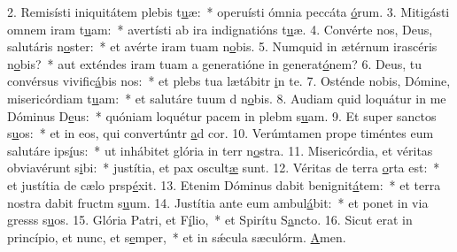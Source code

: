 2. Remisísti iniquitátem plebis t\uline{u}æ:~* operuísti ómnia peccáta \uline{ó}rum.
3. Mitigásti omnem iram t\uline{u}am:~* avertísti ab ira indignatións t\uline{u}æ.
4. Convérte nos, Deus, salutáris n\uline{o}ster:~* et avérte iram tuam  n\uline{o}bis.
5. Numquid in ætérnum irascéris n\uline{o}bis?~* aut exténdes iram tuam a generatióne in generat\uline{ó}nem?
6. Deus, tu convérsus vivific\uline{á}bis nos:~* et plebs tua lætábitr \uline{i}n te.
7. Osténde nobis, Dómine, misericórdiam t\uline{u}am:~* et salutáre tuum d n\uline{o}bis.
8. Audiam quid loquátur in me Dóminus D\uline{e}us:~* quóniam loquétur pacem in plebm s\uline{u}am.
9. Et super sanctos s\uline{u}os:~* et in eos, qui convertúntr \uline{a}d cor.
10. Verúmtamen prope timéntes eum salutáre ips\uline{í}us:~* ut inhábitet glória in terr n\uline{o}stra.
11. Misericórdia, et véritas obviavérunt s\uline{i}bi:~* justítia, et pax oscult\uline{æ} sunt.
12. Véritas de terra \uline{o}rta est:~* et justítia de cælo prsp\uline{é}xit.
13. Etenim Dóminus dabit benignit\uline{á}tem:~* et terra nostra dabit fructm s\uline{u}um.
14. Justítia ante eum ambul\uline{á}bit:~* et ponet in via gresss s\uline{u}os.
15. Glória Patri, et F\uline{í}lio,~* et Spirítu S\uline{a}ncto.
16. Sicut erat in princípio, et nunc, et s\uline{e}mper,~* et in sǽcula sæculórm. \uline{A}men.
